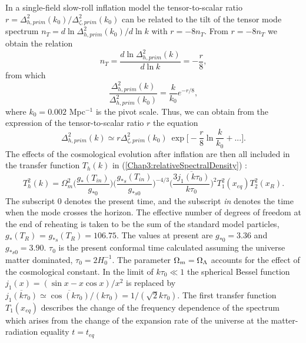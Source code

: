 \documentclass[11pt,a4paper,twoside]{book}
\begin{document}
In a single-field slow-roll inflation model the tensor-to-scalar ratio $ r = \Delta_{h,prim}^{2}(k_{0})/\Delta_{\zeta,prim}^{2}(k_{0}) $ can be related to the tilt of the tensor mode spectrum $ n_{T} = d \ln \Delta_{h,prim}^{2}(k_{0})/d \ln k  $ with $ r=-8n_{T} $. From $ r= - 8n_{T} $ we obtain the relation
\begin{equation}
	\label{Chap3:consistencyRelation}
	n_{T}=\frac{d \ln \Delta_{h,prim}^{2}(k)}{d \ln k} = -\frac{r}{8},
\end{equation}
from which
\begin{equation}
	\label{Chap3:ConsistencyRelation2}
	\frac{\Delta_{h,prim}^{2}(k)}{\Delta^{2}_{h,prim}(k_{0})} = \frac{k}{k_{0}}e^{-r/8},
\end{equation}
where $ k_{0} = 0.002 $ Mpc$^{-1}$ is the pivot scale. Thus, we can obtain from the expression of the tensor-to-scalar ratio $ r $ the equation \cite{Chap3:ProspectsForDeterminationWithDetectors}
\begin{equation}
	\label{Chapter3:solutionSpectrumDelta}
	\Delta^{2}_{h,prim}(k) \simeq r\Delta_{\zeta,prim}^{2}(k_{0})\ \exp \Bigg[-\frac{r}{8}\ln \frac{k}{k_{0}} + ... \Bigg].
\end{equation}
The effects of the cosmological evolution after inflation are then all included in the transfer function $ T_{h}(k) $ in (\ref{Chap3:relativeSpectralDensity}) \cite{Chap3:ProspectsForDeterminationWithDetectors}:
\begin{equation}
	\label{Chap3:FinalTransferFunction}
	T^{2}_{h}(k) = \Omega_{m}^{2}\Bigg (\frac{g_{*}(T_{in})}{g_{*0}}\Bigg)\Bigg (\frac{g_{*s}(T_{in})}{g_{*s0}}\Bigg)^{-4/3} \Bigg ( \overline{\frac{3j_{1}(k\tau_{0})}{k\tau_{0}}}\Bigg)^{2} T_{1}^{2}(x_{eq})T^{2}_{2}(x_{R}).
\end{equation}
The subscript 0 denotes the present time, and the subscript \textit{in} denotes the time when the mode crosses the horizon. The effective number of degrees of freedom at the end of reheating is taken to be the sum of the standard model particles,  $ g_{*}(T_{R}) $ =  $ g_{*s}(T_{R}) = 106.75 $. The values at present are $ g_{*0}=3.36 $ and $ g_{*s0}=3.90 $. $\tau_{0}$ is the present conformal time calculated assuming the universe matter dominated, $ \tau_{0}=2H_{0}^{-1} $. The parameter $\Omega_{m}=\-\Omega_{\Lambda}  $ accounts for the effect of the cosmological constant. In the limit of $ k\tau_{0} \ll 1 $ the spherical Bessel function $ j_{1}(x)=(\sin x -  x\cos x)/x^{2} $ is replaced by $ \overline{j_{1}(k\tau_{0})} \simeq \overline{\cos (k\tau_{0})}/(k\tau_{0}) = 1/(\sqrt{2}k\tau_{0}) $. The first transfer function $ T_{1}(x_{eq}) $  describes the change of the frequency dependence of the spectrum which arises from the change of the expansion rate of the universe at the matter-radiation equality $ t=t_{eq} $
\end{document}
